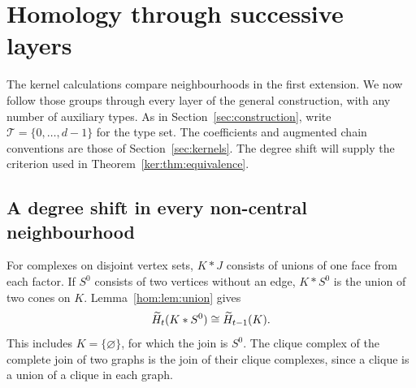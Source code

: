 \section{Homology through successive layers}\label{sec:homology}
The kernel calculations compare neighbourhoods in the first extension.
We now follow those groups through every layer of the general construction,
with any number of auxiliary types. As in Section~\ref{sec:construction},
write $\mathcal{T}=\{0,\ldots,d-1\}$ for the type set. The coefficients and augmented chain
conventions are those of Section~\ref{sec:kernels}. The degree shift will
supply the criterion used in Theorem~\ref{ker:thm:equivalence}.

\subsection{A degree shift in every non-central neighbourhood}

For complexes on disjoint vertex sets, \(K*J\) consists of unions
of one face from each factor. If \(S^0\) consists of two vertices
without an edge, \(K*S^0\) is the union of two cones on \(K\).
Lemma~\ref{hom:lem:union} gives
\begin{equation}\label{hom:eq:suspension}
 \widetilde H_t(K*S^0)\cong\widetilde H_{t-1}(K).
\end{equation}
This includes \(K=\{\varnothing\}\), for which the join is \(S^0\).
The clique complex of the complete join of two graphs is the join
of their clique complexes, since a clique is a union of a clique
in each graph.

